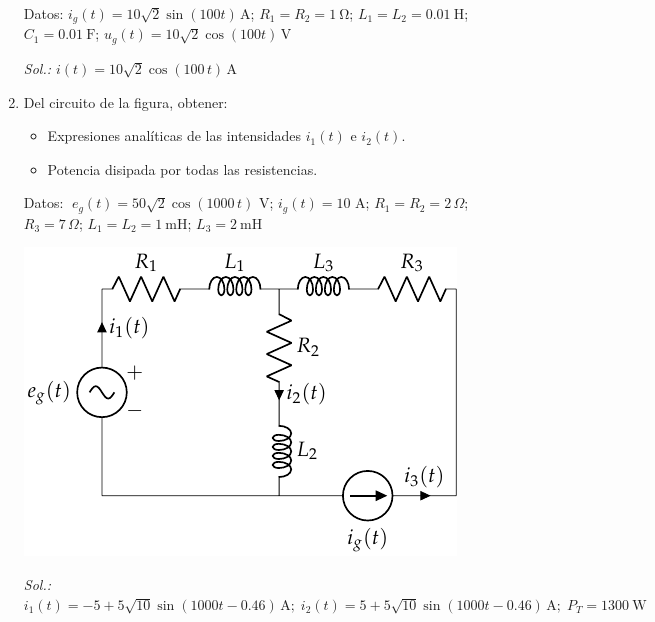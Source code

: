 \begin{enumerate}
Datos:\; $i_g(t) = 10\sqrt{2}\sin(100t)\,\unit{\ampere}$;\; $R_1 = R_2 = \qty{1}{\ohm}$;\; $L_1 = L_2 = \qty{0.01}{\henry}$;\; $C_1 = \qty{0.01}{\farad}$;\; $u_g(t) = 10\sqrt{2}\cos(100t)\,\unit{\volt}$


  \emph{Sol.:\; $i(t)=10\sqrt{2}\cos(100\,t)\,\unit{\ampere}$}

\item Del circuito de la figura, obtener:
  \begin{itemize}
  \item Expresiones analíticas de las intensidades $i_1(t)$ e $i_2(t)$.
  \item Potencia disipada por todas las resistencias.
  \end{itemize}

  Datos: $\; e_g(t)=50\sqrt{2} \cos(1000\,t)$ V; \hspace{2mm}$i_g(t)=10$ A; \hspace{2mm}
$R_1=R_2=2\,\Omega$; \hspace{2mm} $R_3=7\,\Omega$; \hspace{2mm} $L_1=L_2=\qty{1}{\milli\henry}$; \hspace{2mm} $L_3=\qty{2}{\milli\henry}$
  \begin{center}
    \includegraphics{../figs/ej18_BT2.pdf}
  \end{center}
  \emph{Sol.:\; 
    $i_1(t)= -5+5\sqrt{10}\sin(1000t-0.46) \,\si{\ampere};\; i_2(t)=
    5+5\sqrt{10}\sin(1000t-0.46) \,\si{\ampere};\; P_T=\qty{1300}{\watt}$}


\end{enumerate}
